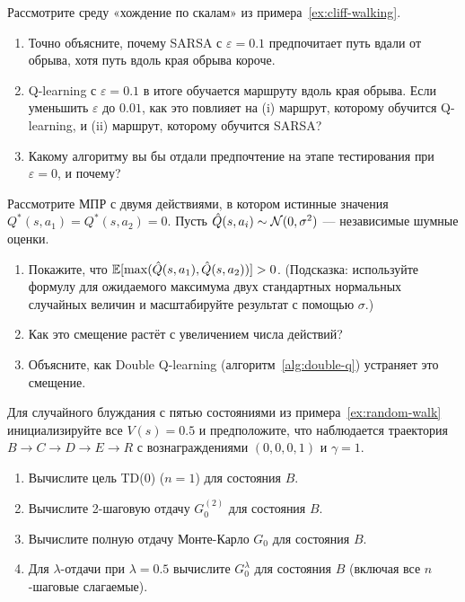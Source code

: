 \begin{exercise}
\label{ex:sarsa-vs-qlearn}
Рассмотрите среду «хождение по скалам» из примера~\ref{ex:cliff-walking}.
\begin{enumerate}[label=(\alph*)]
  \item Точно объясните, почему SARSA с $\varepsilon=0.1$ предпочитает путь вдали от обрыва, хотя путь вдоль края обрыва короче.
  \item Q-learning с $\varepsilon=0.1$ в итоге обучается маршруту вдоль края обрыва.  Если уменьшить $\varepsilon$ до $0.01$, как это повлияет на (i) маршрут, которому обучится Q-learning, и (ii) маршрут, которому обучится SARSA?
  \item Какому алгоритму вы бы отдали предпочтение на этапе тестирования при $\varepsilon=0$, и почему?
\end{enumerate}
\end{exercise}

\begin{exercise}
\label{ex:max-bias}
Рассмотрите МПР с двумя действиями, в котором истинные значения $Q^*(s,a_1)=Q^*(s,a_2)=0$.  Пусть $\hat Q(s,a_i)\sim\mathcal{N}(0,\sigma^2)$ --- независимые шумные оценки.
\begin{enumerate}[label=(\alph*)]
  \item Покажите, что $\operatorname{\mathbb{E}}[\max(\hat Q(s,a_1),\hat Q(s,a_2))]>0$.  (Подсказка: используйте формулу для ожидаемого максимума двух стандартных нормальных случайных величин и масштабируйте результат с помощью $\sigma$.)
  \item Как это смещение растёт с увеличением числа действий?
  \item Объясните, как Double Q-learning (алгоритм~\ref{alg:double-q}) устраняет это смещение.
\end{enumerate}
\end{exercise}

\begin{exercise}
\label{ex:nstep-returns}
Для случайного блуждания с пятью состояниями из примера~\ref{ex:random-walk} инициализируйте все $V(s)=0.5$ и предположите, что наблюдается траектория $B\to C\to D\to E\to R$ с вознаграждениями $(0,0,0,1)$ и $\gamma=1$.
\begin{enumerate}[label=(\alph*)]
  \item Вычислите цель TD(0) ($n=1$) для состояния $B$.
  \item Вычислите 2-шаговую отдачу $G_0^{(2)}$ для состояния $B$.
  \item Вычислите полную отдачу Монте-Карло $G_0$ для состояния $B$.
  \item Для $\lambda$-отдачи при $\lambda=0.5$ вычислите $G_0^\lambda$ для состояния $B$ (включая все $n$-шаговые слагаемые).
\end{enumerate}
\end{exercise}

